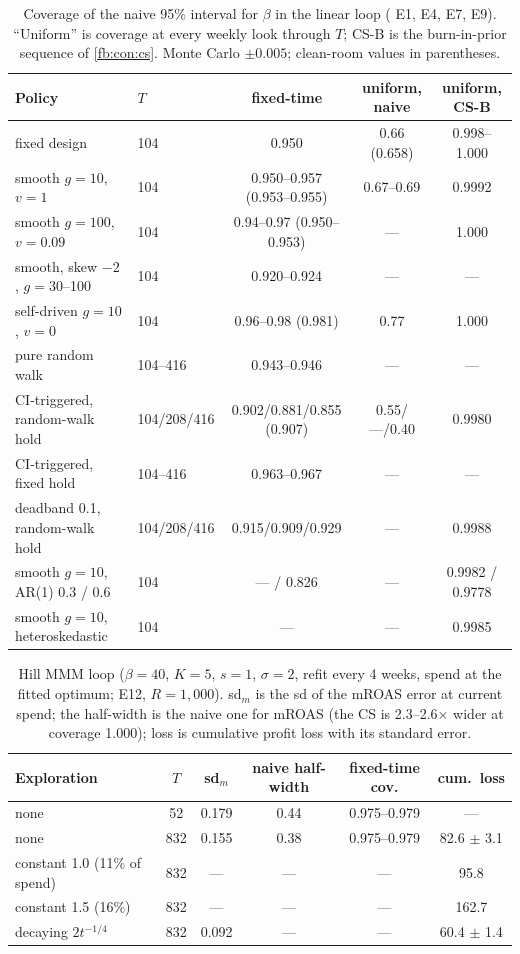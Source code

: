 \begin{table}[htbp]
\centering\footnotesize
\caption{Coverage of the naive 95\% interval for $\beta$ in the linear loop ( E1, E4, E7, E9). ``Uniform'' is coverage at every weekly look through $T$; CS-B is the burn-in-prior sequence of \cref{fb:con:cs}. Monte Carlo $\pm 0.005$; clean-room values in parentheses.}
\label{fb:tab:cover}
\begin{tabular}{llccc}
\toprule
Policy & $T$ & fixed-time & uniform, naive & uniform, CS-B \\
\midrule
fixed design & 104 & 0.950 & 0.66 (0.658) & 0.998--1.000 \\
smooth $g = 10$, $v = 1$ & 104 & 0.950--0.957 (0.953--0.955) & 0.67--0.69 & 0.9992 \\
smooth $g = 100$, $v = 0.09$ & 104 & 0.94--0.97 (0.950--0.953) & --- & 1.000 \\
smooth, skew $-2$, $g = 30$--100 & 104 & 0.920--0.924 & --- & --- \\
self-driven $g = 10$, $v = 0$ & 104 & 0.96--0.98 (0.981) & 0.77 & 1.000 \\
pure random walk & 104--416 & 0.943--0.946 & --- & --- \\
CI-triggered, random-walk hold & 104/208/416 & 0.902/0.881/0.855 (0.907) & 0.55/---/0.40 & 0.9980 \\
CI-triggered, fixed hold & 104--416 & 0.963--0.967 & --- & --- \\
deadband 0.1, random-walk hold & 104/208/416 & 0.915/0.909/0.929 & --- & 0.9988 \\
smooth $g = 10$, AR(1) 0.3 / 0.6 & 104 & --- / 0.826 & --- & 0.9982 / 0.9778 \\
smooth $g = 10$, heteroskedastic & 104 & --- & --- & 0.9985 \\
\bottomrule
\end{tabular}
\end{table}

\begin{table}[htbp]
\centering\small
\caption{Hill MMM loop ($\beta = 40$, $K = 5$, $s = 1$, $\sigma = 2$, refit every 4 weeks, spend at the fitted optimum;  E12, $R = 1{,}000$). sd$_m$ is the sd of the mROAS error at current spend; the half-width is the naive one for mROAS (the CS is 2.3--2.6$\times$ wider at coverage 1.000); loss is cumulative profit loss with its standard error.}
\label{fb:tab:hill}
\begin{tabular}{lccccc}
\toprule
Exploration & $T$ & sd$_m$ & naive half-width & fixed-time cov. & cum.\ loss \\
\midrule
none & 52 & 0.179 & 0.44 & 0.975--0.979 & --- \\
none & 832 & 0.155 & 0.38 & 0.975--0.979 & 82.6 $\pm$ 3.1 \\
constant 1.0 (11\% of spend) & 832 & --- & --- & --- & 95.8 \\
constant 1.5 (16\%) & 832 & --- & --- & --- & 162.7 \\
decaying $2t^{-1/4}$ & 832 & 0.092 & --- & --- & 60.4 $\pm$ 1.4 \\
\bottomrule
\end{tabular}
\end{table}

